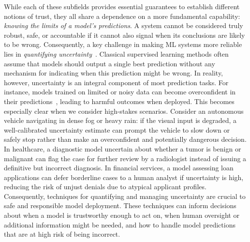 While each of these subfields provides essential guarantees to establish different notions of trust, they all share a dependence on a more fundamental capability: \textit{knowing the limits of a model's predictions}. A system cannot be considered truly robust, safe, or accountable if it cannot also signal when its conclusions are likely to be wrong. Consequently, a key challenge in making ML systems more reliable lies in \textit{quantifying uncertainty}~\citep{gal2016uncertainty, hullermeier2021aleatoric, gawlikowski2023survey}. Classical supervised learning methods often assume that models should output a single best prediction without any mechanism for indicating when this prediction might be wrong. In reality, however, uncertainty is an integral component of most prediction tasks. For instance, models trained on limited or noisy data can become overconfident in their predictions~\citep{guo2017calibration}, leading to harmful outcomes when deployed. This becomes especially clear when we consider high-stakes scenarios. Consider an autonomous vehicle navigating in dense fog or heavy rain: if the visual input is degraded, a well-calibrated uncertainty estimate can prompt the vehicle to slow down or safely stop rather than make an overconfident and potentially dangerous decision. In healthcare, a diagnostic model uncertain about whether a tumor is benign or malignant can flag the case for further review by a radiologist instead of issuing a definitive but incorrect diagnosis. In financial services, a model assessing loan applications can defer borderline cases to a human analyst if uncertainty is high, reducing the risk of unjust denials due to atypical applicant profiles. Consequently, techniques for quantifying and managing uncertainty are crucial to safe and responsible model deployment. These techniques can inform decisions about when a model is trustworthy enough to act on, when human oversight or additional information might be needed, and how to handle model predictions that are at high risk of being incorrect.

